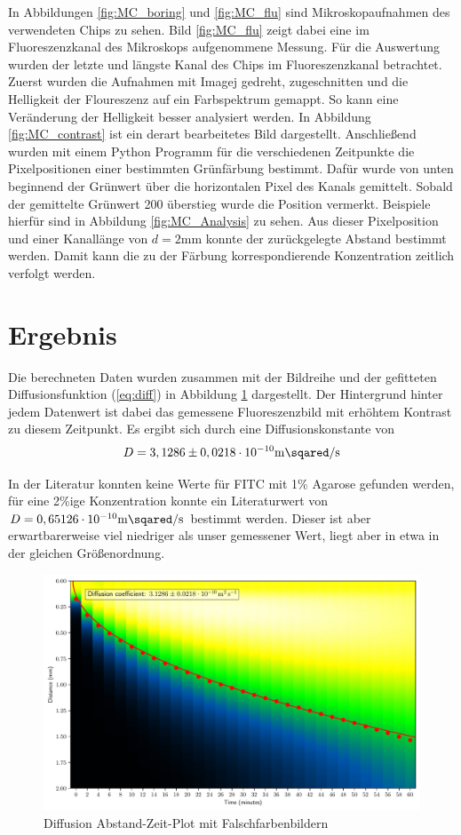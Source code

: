 \documentclass[11pt, a4paper]{article}
\begin{document}
In Abbildungen \ref{fig:MC_boring} und \ref{fig:MC_flu} sind Mikroskopaufnahmen des verwendeten Chips zu sehen. Bild \ref{fig:MC_flu} zeigt dabei eine im Fluoreszenzkanal des Mikroskops aufgenommene Messung. Für die Auswertung wurden der letzte und längste Kanal des Chips im Fluoreszenzkanal betrachtet. Zuerst wurden die Aufnahmen mit Imagej \cite{immagejay} gedreht, zugeschnitten und die Helligkeit der Floureszenz auf ein Farbspektrum gemappt. So kann eine Veränderung der Helligkeit besser analysiert werden. In Abbildung \ref{fig:MC_contrast} ist ein derart bearbeitetes Bild dargestellt. Anschließend wurden mit einem Python Programm für die verschiedenen Zeitpunkte die Pixelpositionen einer bestimmten Grünfärbung bestimmt. Dafür wurde von unten beginnend der Grünwert über die horizontalen Pixel des Kanals gemittelt. Sobald der gemittelte Grünwert 200 überstieg wurde die Position vermerkt. Beispiele hierfür sind in Abbildung \ref{fig:MC_Analysis} zu sehen. Aus dieser Pixelposition und einer Kanallänge von $d = 2 \si{\milli\meter}$ konnte der zurückgelegte Abstand bestimmt werden. Damit kann die zu der Färbung korrespondierende Konzentration zeitlich verfolgt werden. 

\section{Ergebnis}
Die berechneten Daten wurden zusammen mit der Bildreihe und der gefitteten Diffusionsfunktion (\ref{eq:diff}) in Abbildung \ref{fig:gigaplot} dargestellt. Der Hintergrund hinter jedem Datenwert ist dabei das gemessene Fluoreszenzbild mit erhöhtem Kontrast zu diesem Zeitpunkt. Es ergibt sich durch eine Diffusionskonstante von
\begin{align}
    D = 3,1286 \pm 0,0218 \cdot 10^{-10} \si{\meter \sqared \per \second} 
\end{align}

In der Literatur konnten keine Werte für FITC mit 1\% Agarose gefunden werden, für eine 2\%ige Konzentration konnte ein Literaturwert von $ D = 0,65126 \cdot 10^{-10} \si{\meter \sqared \per \second} $ \cite{lit} bestimmt werden. Dieser ist aber erwartbarerweise viel niedriger als unser gemessener Wert, liegt aber in etwa in der gleichen Größenordnung.

\begin{figure}
    \centering
    \includegraphics[max width=\linewidth]{Finalplot.pdf}
    \caption{Diffusion Abstand-Zeit-Plot mit Falschfarbenbildern}
    \label{fig:gigaplot}
\end{figure}



\end{document}
